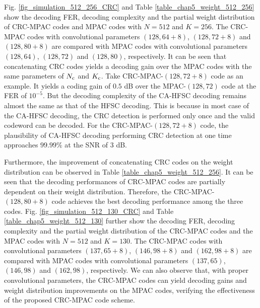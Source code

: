 \documentclass[12pt, draftclsnofoot, peerreview, onecolumn]{IEEEtran}
\theoremstyle{noparent}
\begin{document}
Fig. \ref{fig_simulation_512_256_CRC} and Table \ref{table_chap5_weight_512_256} show the decoding FER, 
decoding complexity and the partial weight distribution of 
CRC-MPAC codes and MPAC codes with $N = 512$ and $K = 256$. 
The CRC-MPAC codes with convolutional parameters $(128, 64+8)$, $(128, 72+8)$ and $(128, 80+8)$ 
are compared with MPAC codes with convolutional parameters $(128, 64)$, $(128, 72)$ and $(128, 80)$, respectively. 
It can be seen that concatenating CRC codes yields a decoding gain over 
the MPAC codes with the same parameters of $N_{\rm c}$ and $K_{\rm c}$. 
Take CRC-MPAC-$(128, 72+8)$ code as an example. 
It yields a coding gain of $0.5$ dB over the MPAC-$(128, 72)$ code
at the FER of $10^{-5}$. 
But the decoding complexity of the CA-HFSC decoding remains almost the same as that of the HFSC decoding. 
This is because in most case of the CA-HFSC decoding, 
the CRC detection is performed only once and the valid codeword can be decoded. 
For the CRC-MPAC-$(128, 72+8)$ code, 
the plausibility of CA-HFSC decoding performing CRC detection at one time approaches $99.99\%$ at the SNR of $3$ dB. 

Furthermore, the improvement of concatenating CRC codes on the weight distribution 
can be observed in Table \ref{table_chap5_weight_512_256}. 
It can be seen that the decoding performances of CRC-MPAC codes are partially dependent on their weight distribution. 
Therefore, the CRC-MPAC-$(128, 80+8)$ code achieves the best decoding performance 
among the three codes.
Fig. \ref{fig_simulation_512_130_CRC} and Table \ref{table_chap5_weight_512_130} 
further show the decoding FER, decoding complexity and the partial weight distribution of 
the CRC-MPAC codes and the MPAC codes with $N = 512$ and $K = 130$. 
The CRC-MPAC codes with convolutional parameters $(137, 65+8)$, $(146, 98+8)$ and $(162, 98+8)$ are 
compared with MPAC codes with convolutional parameters $(137, 65)$, $(146, 98)$ and $(162, 98)$, respectively. 
We can also observe that, with proper convolutional parameters, 
the CRC-MPAC codes can yield decoding gains and weight distribution improvements
on the MPAC codes,
verifying the effectiveness of the proposed CRC-MPAC code scheme.
\end{document}

